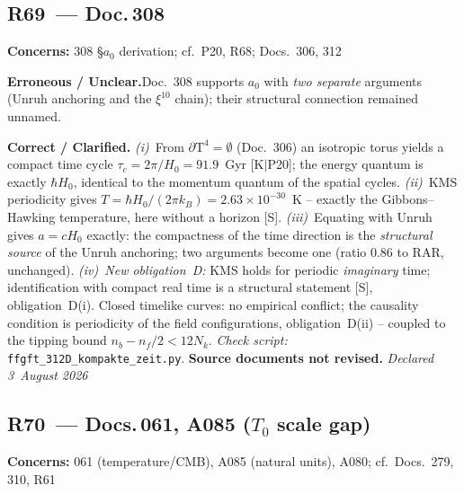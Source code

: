 \medskip

\subsection*{R69~--- Doc.\,308}

\noindent\textbf{Concerns:} 308 \S{}$a_0$ derivation; cf.\ P20, R68;
Docs.~306, 312

\smallskip\noindent\textbf{Erroneous / Unclear.}\quad Doc.~308 supports
$a_0$ with \emph{two separate} arguments (Unruh anchoring and the
$\xi^{10}$ chain); their structural connection remained unnamed.

\smallskip\noindent\textbf{Correct / Clarified.}\quad
\emph{(i)}~From $\partial\text{T}^4 = \emptyset$ (Doc.~306) an isotropic
torus yields a compact time cycle $\tau_c = 2\pi/H_0 = 91.9$~Gyr
[K$|$P20]; the energy quantum is exactly $\hbar H_0$, identical to the
momentum quantum of the spatial cycles. \emph{(ii)}~KMS periodicity
gives $T = \hbar H_0/(2\pi k_B) = 2.63\times10^{-30}$~K -- exactly the
Gibbons--Hawking temperature, here without a horizon [S].
\emph{(iii)}~Equating with Unruh gives $a = cH_0$ exactly: the
compactness of the time direction is the \emph{structural source} of the
Unruh anchoring; two arguments become one (ratio $0.86$ to RAR,
unchanged). \emph{(iv)~New obligation~D:} KMS holds for periodic
\emph{imaginary} time; identification with compact real time is a
structural statement [S], obligation~D(i). Closed timelike curves: no
empirical conflict; the causality condition is periodicity of the field
configurations, obligation~D(ii) -- coupled to the tipping bound
$n_b - n_f/2 < 12N_k$. \emph{Check script:}
\texttt{ffgft\_312D\_kompakte\_zeit.py}.
\textbf{Source documents not revised.} \emph{Declared 3~August 2026}

\medskip

\subsection*{R70~--- Docs.\,061, A085 ($T_0$ scale gap)}

\noindent\textbf{Concerns:} 061 (temperature/CMB), A085 (natural units),
A080; cf.\ Docs.~279, 310, R61


